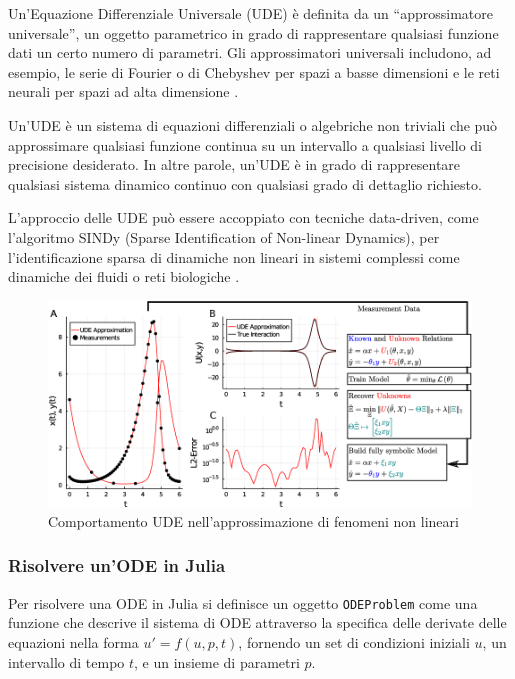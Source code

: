 Un'Equazione Differenziale Universale (UDE) è definita da un 
``approssimatore universale'', un oggetto parametrico in grado di 
rappresentare qualsiasi funzione dati un certo numero di parametri. 
Gli approssimatori universali includono, ad esempio, le serie di Fourier 
o di Chebyshev per spazi a basse dimensioni e le reti neurali per spazi 
ad alta dimensione \cite{rackauckas2020universal}.

Un'UDE è un sistema di equazioni differenziali o algebriche non triviali 
che può approssimare qualsiasi funzione continua su un intervallo a 
qualsiasi livello di precisione desiderato. In altre parole, un'UDE è 
in grado di rappresentare qualsiasi sistema dinamico continuo con 
qualsiasi grado di dettaglio richiesto.

L'approccio delle UDE può essere accoppiato con tecniche data-driven, 
come l'algoritmo SINDy (Sparse Identification of Non-linear Dynamics), 
per l'identificazione sparsa di dinamiche non lineari in sistemi 
complessi come dinamiche dei fluidi o reti biologiche \cite{datadrivendiffeq}.

\begin{figure}[H]
    \begin{center}
        \includegraphics[scale=0.35]{img/ude_approx.png}
        \caption{Comportamento UDE nell'approssimazione di fenomeni non lineari \cite{rackauckas2020universal}}
        \label{fig:UDE_approx}
    \end{center}
\end{figure}

\subsubsection*{Risolvere un'ODE in Julia}

Per risolvere una ODE in Julia si definisce un oggetto \texttt{ODEProblem} come 
una funzione che descrive il sistema di ODE attraverso la specifica 
delle derivate delle equazioni nella forma $u' = f(u, p, t)$, fornendo 
un set di condizioni iniziali $u$, un intervallo di tempo $t$, e un 
insieme di parametri $p$.

